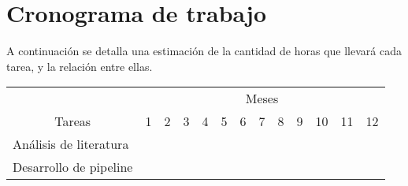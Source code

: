 \documentclass[
    left=2.0cm,         %
    right=2.0cm,        %
    top=2.0cm,          %
    bottom=2.5cm,         %
    bindingoffset=6mm,  %
    nohyphenation=false %
]{eiti/eiti-thesis}
\begin{document}

\newpage
\section{Cronograma de trabajo}

A continuación se detalla una estimación de la cantidad de horas que llevará cada tarea,
y la relación entre ellas. 

\begin{table}[h]
\begin{tabular}{|l|l|l|l|l|l|l|l|l|l|l|l|l|}
\hline
\multicolumn{1}{|c|}{}                         & \multicolumn{12}{c|}{Meses}                                                                                                                                                                                                                                                                                                                                                                                                                                                 \\ \cline{2-13} 
\multicolumn{1}{|c|}{\multirow{-2}{*}{Tareas}} & 1                                               & 2                                               & 3                        & 4                        & 5                                               & 6                        & 7                                               & 8                                               & 9                        & 10                                              & 11                       & 12                       \\ \hline
Análisis de literatura                         & \cellcolor[HTML]{000000}{\color[HTML]{000000} } & \cellcolor[HTML]{000000}{\color[HTML]{000000} } &                          &                          &                                                 &                          &                                                 &                                                 &                          &                                                 &                          &                          \\ \hline
Desarrollo de pipeline                         &                                                 & \cellcolor[HTML]{000000}                        & \cellcolor[HTML]{000000} &                          &                                                 &                          &                                                 &                                                 &                          &                                                 &                          &                          \\ \hline

\end{tabular}
\end{table}
\end{document}
